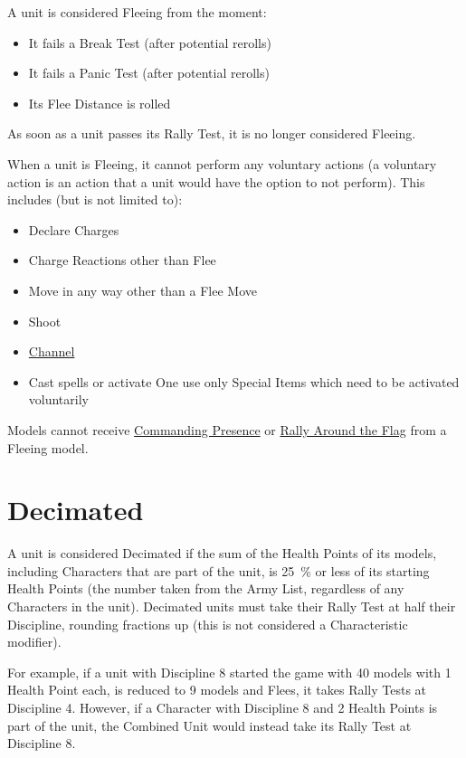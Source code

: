 A unit is considered Fleeing from the moment:
\begin{itemize}
\item It fails a Break Test (after potential rerolls)
\item It fails a Panic Test (after potential rerolls)
\item Its Flee Distance is rolled
\end{itemize}

As soon as a unit passes its Rally Test, it is no longer considered Fleeing.

When a unit is Fleeing, it cannot perform any voluntary actions (a voluntary action is an action that a unit would have the option to not perform). This includes (but is not limited to):

\begin{itemize}
\item Declare Charges
\item Charge Reactions other than Flee
\item Move in any way other than a Flee Move
\item Shoot
\item \hyperref[channel]{Channel}
\item Cast spells or activate One use only Special Items which need to be activated voluntarily
\end{itemize}

Models cannot receive \hyperref[commanding_presence]{Commanding Presence} or \hyperref[rally_around_the_flag]{Rally Around the Flag} from a Fleeing model.

\section{Decimated}
\label{decimated}

A unit is considered Decimated if the sum of the Health Points of its models, including Characters that are part of the unit, is \SI{25}{\percent} or less of its starting Health Points (the number taken from the Army List, regardless of any Characters in the unit). Decimated units must take their Rally Test at half their Discipline, rounding fractions up (this is not considered a Characteristic modifier).

For example, if a unit with Discipline 8 started the game with 40 models with 1 Health Point each, is reduced to 9 models and Flees, it takes Rally Tests at Discipline 4. However, if a Character with Discipline 8 and 2 Health Points is part of the unit, the Combined Unit would instead take its Rally Test at Discipline 8.
